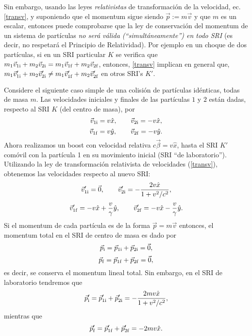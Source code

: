 Sin embargo, usando las leyes \textit{relativistas} de transformación de la velocidad, ec. \eqref{transv}, y suponiendo que el momentum sigue siendo $\vec{p}:=m\vec{v}$ y que $m$ es un escalar, entonces puede comprobarse que la ley de conservación del momentum de un sistema de partículas \textit{no será válida (``simultáneamente'') en todo SRI} (es decir, no respetará el Principio de Relatividad). Por ejemplo en un choque de dos partículas, si en un SRI particular $K$ se verifica que $m_1\vec{v}_{1\rm i}+m_2\vec{v}_{2\rm i} =m_1\vec{v}_{1\rm f}+m_2\vec{v}_{2\rm f}$, entonces, \eqref{transv} implican en general que, $m_1\vec{v}'_{1\rm i}+m_2\vec{v}'_{2\rm i} \neq m_1\vec{v}'_{1\rm f}+m_2\vec{v}'_{2\rm f}$ en otros SRI's $K'$.

Considere el siguiente caso simple de una colisión de partículas idénticas, todas de masa $m$.
Las velocidades iniciales y finales de las partículas $1$ y $2$ están dadas, respecto al SRI $K$ (del centro de masa), por
\begin{equation}
 \vec{v}_{1\rm i}=v \hat{x}, \qquad \vec{v}_{2\rm i}=-v \hat{x},
\end{equation}
\begin{equation}
 \vec{v}_{1\rm f}=v \hat{y}, \qquad \vec{v}_{2\rm f}=-v \hat{y}.
\end{equation}
Ahora realizamos un boost con velocidad relativa $c\vec\beta=v\hat{x}$, hasta el SRI $K'$ comóvil con la partícula 1 en su movimiento inicial (SRI ``de laboratorio''). Utilizando la ley de transformación relativista de velocidades (\ref{transv}), obtenemos las velocidades respecto al nuevo SRI:
\begin{equation}
 \vec{v}'_{1\rm i}=\vec{0}, \qquad \vec{v}'_{2\rm i}=-\frac{2v \hat{x}}{1+v^2/c^2},
\end{equation}
\begin{equation}
 \vec{v}'_{1\rm f}=-v\hat{x}+\frac{v}{\gamma} \hat{y}, \qquad \vec{v}'_{2\rm f}=-v\hat{x}-\frac{v}{\gamma} \hat{y}.
\end{equation}
Si el momentum de cada partícula es de la forma $\vec{p}=m\vec{v}$ entonces, el momentum total en el SRI de centro de masa es dado por
\begin{equation}
 \vec{p}_{\rm i}=\vec{p}_{1\rm i}+\vec{p}_{2\rm i}=\vec{0},
\end{equation}
\begin{equation}
 \vec{p}_{\rm f}=\vec{p}_{1\rm f}+\vec{p}_{2\rm f}=\vec{0},
\end{equation}
es decir, se conserva el momentum lineal total. Sin embargo, en el SRI de laboratorio tendremos que
\begin{equation}
 \vec{p}'_{\rm i}=\vec{p}'_{1\rm i}+\vec{p}'_{2\rm i}=-\frac{2mv\hat{x}}{1+v^2/c^2},
\end{equation}
mientras que
\begin{equation}
 \vec{p}'_{\rm f}=\vec{p}'_{1\rm f}+\vec{p}'_{2\rm f}=-2mv\hat{x}.
\end{equation}

